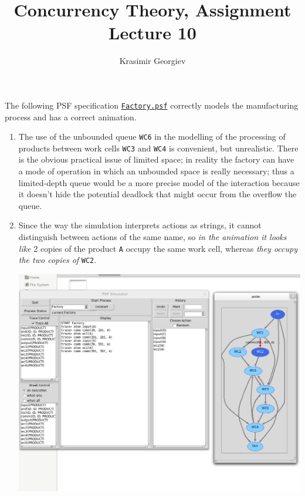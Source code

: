 \documentclass[a4paper]{article}
\title{Concurrency Theory, Assignment Lecture 10}
\author{Krasimir Georgiev}
\newcommand{\prog}[1]{\texttt{#1}}
\begin{document}
\maketitle

The following PSF specification
\href{https://github.com/comco/concurrency-theory-assignments/tree/master/assignment-lecture-10/Factory.psf}{\texttt{Factory.psf}}
correctly models the manufacturing process and has a correct animation.

\begin{enumerate}
    \item The use of the unbounded queue \prog{WC6} in the modelling of the
        processing of products between work cells \prog{WC3} and \prog{WC4} is
        convenient, but unrealistic. There is the obvious practical issue of
        limited space; in reality the factory can have a mode of operation in
        which an unbounded space is really necessary; thus a limited-depth queue
        would be a more precise model of the interaction because it doesn't hide
        the potential deadlock that might occur from the overflow the queue.

    \item Since the way the simulation interprets actions as strings, it cannot
        distinguish between actions of the same name, so \emph{in the animation
        it looks like} 2 copies of the product \prog{A} occupy the same work
        cell, whereas \emph{they occupy the two copies of} \prog{WC2}.

        \includegraphics[scale=0.3]{animation-merged-1.png}


\end{enumerate}
\end{document}
